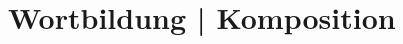 \documentclass[handout,aspectratio=1610,dvipsnames]{beamer}
\begin{document}
  \section{Wortbildung | Komposition}
  \let\woopsi\section\let\section\subsection\let\subsection\subsubsection
  
  \let\subsection\section\let\section\woopsi
  
\end{document}
